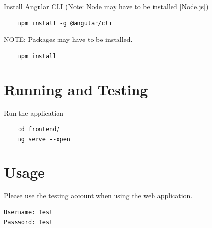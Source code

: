 Install Angular CLI (Note: Node may have to be installed [\href{https://nodejs.org/en/}{Node.js}])
\begin{verbatim}
	npm install -g @angular/cli
\end{verbatim}

NOTE: Packages may have to be installed.
\begin{verbatim}
	npm install
\end{verbatim}

\section{Running and Testing}
Run the application
\begin{verbatim}
	cd frontend/
	ng serve --open
\end{verbatim}

\section{Usage}
Please use the testing account when using the web application.
\begin{verbatim}
Username: Test
Password: Test
\end{verbatim}



